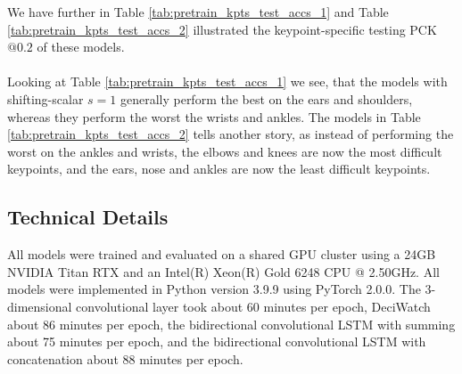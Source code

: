 \documentclass[./main.tex]{subfiles}
\begin{document}
\noindent We have further in Table \ref{tab:pretrain_kpts_test_accs_1} and Table \ref{tab:pretrain_kpts_test_accs_2} illustrated the keypoint-specific testing PCK$@0.2$ of these models.
\\
\\
Looking at Table \ref{tab:pretrain_kpts_test_accs_1} we see, that the models with shifting-scalar $s = 1$ generally perform the best on the ears and shoulders, whereas they perform the worst the wrists and ankles. The models in Table \ref{tab:pretrain_kpts_test_accs_2} tells another story, as instead of performing the worst on the ankles and wrists, the elbows and knees are now the most difficult keypoints, and the ears, nose and ankles are now the least difficult keypoints.

\subsection{Technical Details}
All models were trained and evaluated on a shared GPU cluster using a 24GB NVIDIA Titan RTX and an Intel(R) Xeon(R) Gold 6248 CPU @ 2.50GHz. All models were implemented in Python version 3.9.9 using PyTorch 2.0.0. The 3-dimensional convolutional layer took about 60 minutes per epoch, DeciWatch about 86 minutes per epoch, the bidirectional convolutional LSTM with summing about 75 minutes per epoch, and the bidirectional convolutional LSTM with concatenation about 88 minutes per epoch.
\end{document}
